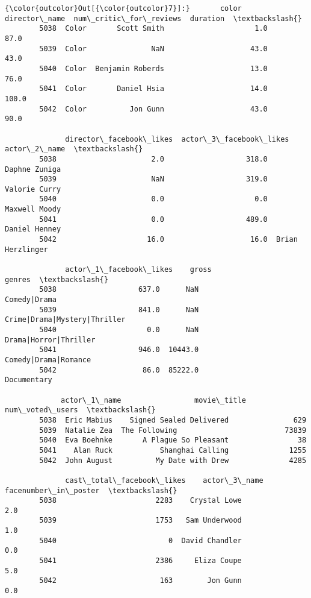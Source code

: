 \documentclass[11pt]{article}
\begin{document}
\begin{Verbatim}[commandchars=\\\{\}]
{\color{outcolor}Out[{\color{outcolor}7}]:}       color     director\_name  num\_critic\_for\_reviews  duration  \textbackslash{}
        5038  Color       Scott Smith                     1.0      87.0   
        5039  Color               NaN                    43.0      43.0   
        5040  Color  Benjamin Roberds                    13.0      76.0   
        5041  Color       Daniel Hsia                    14.0     100.0   
        5042  Color          Jon Gunn                    43.0      90.0   
        
              director\_facebook\_likes  actor\_3\_facebook\_likes      actor\_2\_name  \textbackslash{}
        5038                      2.0                   318.0     Daphne Zuniga   
        5039                      NaN                   319.0     Valorie Curry   
        5040                      0.0                     0.0     Maxwell Moody   
        5041                      0.0                   489.0     Daniel Henney   
        5042                     16.0                    16.0  Brian Herzlinger   
        
              actor\_1\_facebook\_likes    gross                        genres  \textbackslash{}
        5038                   637.0      NaN                  Comedy|Drama   
        5039                   841.0      NaN  Crime|Drama|Mystery|Thriller   
        5040                     0.0      NaN         Drama|Horror|Thriller   
        5041                   946.0  10443.0          Comedy|Drama|Romance   
        5042                    86.0  85222.0                   Documentary   
        
             actor\_1\_name                 movie\_title  num\_voted\_users  \textbackslash{}
        5038  Eric Mabius    Signed Sealed Delivered               629   
        5039  Natalie Zea  The Following                         73839   
        5040  Eva Boehnke       A Plague So Pleasant                38   
        5041    Alan Ruck           Shanghai Calling              1255   
        5042  John August          My Date with Drew              4285   
        
              cast\_total\_facebook\_likes    actor\_3\_name  facenumber\_in\_poster  \textbackslash{}
        5038                       2283    Crystal Lowe                   2.0   
        5039                       1753   Sam Underwood                   1.0   
        5040                          0  David Chandler                   0.0   
        5041                       2386     Eliza Coupe                   5.0   
        5042                        163        Jon Gunn                   0.0   
        

\end{Verbatim}
\end{document}
